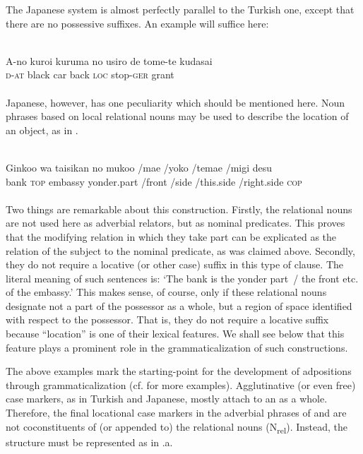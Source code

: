 The Japanese system is almost perfectly parallel to the Turkish one, except that there are no possessive suffixes. An example will suffice here:

\ea\label{ex:E51}
 \\
\gll A-no  kuroi  kuruma  no  usiro  de  tome-te  kudasai\\
\textsc{d}-\textsc{at}  black  car  {\glgen}  back  \textsc{loc}  stop-\textsc{ger}  grant\\
\\
\z
\noindent Japanese, however, has one peculiarity which should be mentioned here. Noun phrases based on local relational nouns may be used to describe the location of an object, as in .

\ea\label{ex:E52}
 \\
\gll  Ginkoo  wa  taisikan  no  mukoo  /mae  /yoko  /temae  /migi  desu\\
bank  \textsc{top}  embassy  {\glgen}  yonder.part  /front  /side  /this.side  /right.side  \textsc{cop}\\
\\
\z
\noindent Two things are remarkable about this construction. Firstly, the relational nouns are not used here as adverbial relators, but as nominal predicates. This proves that the modifying relation in which they take part can be explicated as the relation of the subject to the nominal predicate, as was claimed above. Secondly, they do not require a locative (or other case) suffix in this type of clause. The literal meaning of such sentences is: ‘The bank is the yonder part~/ the front etc. of the embassy.’ This makes sense, of course, only if these relational nouns designate not a part of the possessor as a whole, but a region of space identified with respect to the possessor. That is, they do not require a locative suffix because ``location'' is one of their lexical features. We shall see below that this feature plays a prominent role in the grammaticalization of such constructions.

The above examples mark the starting-point for the development of adpositions through grammaticalization (cf. \citealt[446, fn 5]{MallinsonEtAl1981} for more examples). Agglutinative (or even free) case markers, as in Turkish and Japanese, mostly attach to an \np as a whole. Therefore, the final locational case markers in the adverbial phrases of  and  are not coconstituents of (or appended to) the relational nouns (N\textsubscript{rel}). Instead, the structure must be represented as in .a.

